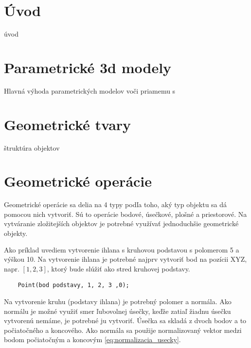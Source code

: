 \usepackage{todonotes}


\chapter{Úvod}
úvod

\chapter{Parametrické 3d modely}
Hlavná výhoda parametrických modelov voči priamemu  s



\chapter{Geometrické tvary}
\label{chapt:Geometrické_tvary}
štruktúra objektov



\chapter{Geometrické operácie}
Geometrické operácie sa delia na 4 typy podľa toho, aký typ objektu sa dá pomocou nich vytvoriť. Sú to operácie bodové, úsečkové, plošné a priestorové. Na vytváranie zložitejších objektov je potrebné využívať jednoduchšie geometrické objekty. 


Ako príklad uvediem vytvorenie ihlana s kruhovou podstavou s polomerom 5 a výškou 10. Na vytvorenie ihlana je potrebné najprv vytvoriť bod na pozícii XYZ, napr. $\left [ 1, 2, 3 \right ]$, ktorý bude slúžiť ako stred kruhovej podstavy.
\begin{lstlisting}
    Point(bod podstavy, 1, 2, 3 ,0);
\end{lstlisting}
Na vytvorenie kruhu (podstavy ihlana) je potrebný polomer a normála. Ako normálu je možné využiť smer ľubovolnej úsečky, keďže zatiaľ žiadnu úsečku vytvorenú nemáme, je potrebné ju vytvoriť. Úsečka sa skladá z dvoch bodov a to počiatočného a koncového. Ako normála sa použije normalizovaný vektor medzi bodom počiatočným a koncovým \ref{eq:normalizacia_usecky}.

